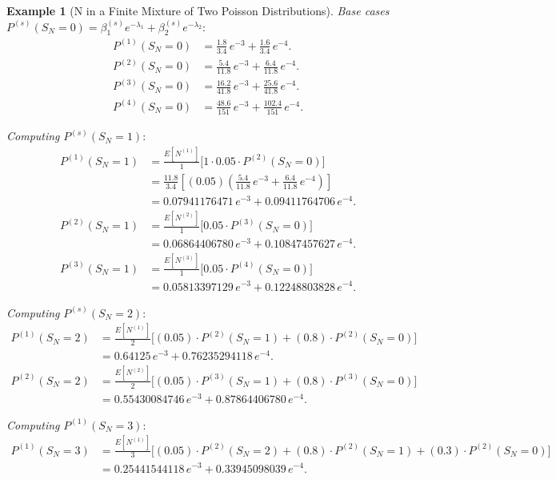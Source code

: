 \documentclass[11pt]{amsart}
\theoremstyle{definition}
\newtheorem{example}{Example}
\theoremstyle{plain}
\begin{document}
\begin{example}[N in a Finite Mixture of Two Poisson Distributions]
\medskip
\noindent\textit{Base cases} $P^{(s)}(S_N = 0) = \beta_1^{(s)}e^{-\lambda_1}
+ \beta_2^{(s)}e^{-\lambda_2}$:
\begin{align*}
P^{(1)}(S_N = 0) &= \tfrac{1.8}{3.4}\,e^{-3} + \tfrac{1.6}{3.4}\,e^{-4}. \\
P^{(2)}(S_N = 0) &= \tfrac{5.4}{11.8}\,e^{-3} + \tfrac{6.4}{11.8}\,e^{-4}. \\
P^{(3)}(S_N = 0) &= \tfrac{16.2}{41.8}\,e^{-3} + \tfrac{25.6}{41.8}\,e^{-4}. \\
P^{(4)}(S_N = 0) &= \tfrac{48.6}{151}\,e^{-3} + \tfrac{102.4}{151}\,e^{-4}.
\end{align*}

\medskip
\noindent\textit{Computing} $P^{(s)}(S_N = 1)$:
\begin{align*}
P^{(1)}(S_N = 1)
    &= \frac{E[N^{(1)}]}{1}\bigl[1 \cdot 0.05 \cdot P^{(2)}(S_N = 0)\bigr] \\
    &= \frac{11.8}{3.4}\left[(0.05)\!\left(\frac{5.4}{11.8}\,e^{-3}
       + \frac{6.4}{11.8}\,e^{-4}\right)\right] \\
    &= 0.07941176471\,e^{-3} + 0.09411764706\,e^{-4}. \\
P^{(2)}(S_N = 1)
    &= \frac{E[N^{(2)}]}{1}\bigl[0.05 \cdot P^{(3)}(S_N = 0)\bigr] \\
    &= 0.06864406780\,e^{-3} + 0.10847457627\,e^{-4}. \\
P^{(3)}(S_N = 1)
    &= \frac{E[N^{(3)}]}{1}\bigl[0.05 \cdot P^{(4)}(S_N = 0)\bigr] \\
    &= 0.05813397129\,e^{-3} + 0.12248803828\,e^{-4}.
\end{align*}

\medskip
\noindent\textit{Computing} $P^{(s)}(S_N = 2)$:
\begin{align*}
P^{(1)}(S_N = 2)
    &= \frac{E[N^{(1)}]}{2}
       \bigl[(0.05)\cdot P^{(2)}(S_N = 1) + (0.8)\cdot P^{(2)}(S_N = 0)\bigr] \\
    &= 0.64125\,e^{-3} + 0.76235294118\,e^{-4}. \\
P^{(2)}(S_N = 2)
    &= \frac{E[N^{(2)}]}{2}
       \bigl[(0.05)\cdot P^{(3)}(S_N = 1) + (0.8)\cdot P^{(3)}(S_N = 0)\bigr] \\
    &= 0.55430084746\,e^{-3} + 0.87864406780\,e^{-4}.
\end{align*}

\medskip
\noindent\textit{Computing} $P^{(1)}(S_N = 3)$:
\begin{align*}
P^{(1)}(S_N = 3)
    &= \frac{E[N^{(1)}]}{3}
       \bigl[(0.05)\cdot P^{(2)}(S_N = 2)
       + (0.8)\cdot P^{(2)}(S_N = 1)
       + (0.3)\cdot P^{(2)}(S_N = 0)\bigr] \\
    &= 0.25441544118\,e^{-3} + 0.33945098039\,e^{-4}.
\end{align*}


\end{example}
\end{document}
